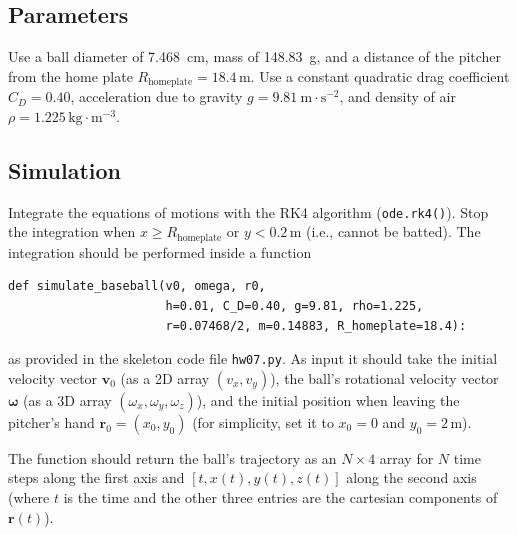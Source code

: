 \documentclass[letterpaper]{scrartcl}
\renewcommand{\vec}[1]{\ensuremath{\mathbf{#1}}}
\begin{document}
\subsection{Parameters}
\label{sec:parameters}

Use a ball diameter of 7.468~cm, mass of 148.83~g, and a distance of
the pitcher from the home plate $R_\text{homeplate} =
18.4\,\text{m}$.
Use a constant quadratic drag coefficient $C_{D} = 0.40$,
acceleration due to gravity $g = 9.81~\text{m}\cdot\text{s}^{-2}$, and
density of air $\rho = 1.225\,\text{kg}\cdot\text{m}^{-3}$.


\subsection{Simulation}
\label{sec:sim}

Integrate the equations of motions with the RK4 algorithm
(\texttt{ode.rk4()}). Stop the integration when
$x \ge R_\text{homeplate}$ or $y < 0.2\,\text{m}$
(i.e., cannot be batted). The integration should be performed inside a
function
\begin{verbatim}
def simulate_baseball(v0, omega, r0,
                      h=0.01, C_D=0.40, g=9.81, rho=1.225,
                      r=0.07468/2, m=0.14883, R_homeplate=18.4):  
\end{verbatim}
as provided in the skeleton code file \texttt{hw07.py}. As input it
should take the initial velocity vector $\vec{v}_{0}$ (as a 2D array
$(v_{x}, v_{y})$), the ball's rotational velocity vector
$\boldsymbol{\omega}$ (as a 3D array
$(\omega_{x}, \omega_{y}, \omega_{z})$), and the initial position when
leaving the pitcher's hand $\vec{r}_{0} = (x_{0}, y_{0})$ (for
simplicity, set it to $x_{0}=0$ and $y_{0}=2\,\text{m}$).

The function should return the ball's trajectory as an $N \times 4$
array for $N$ time steps along the first axis and
$[t, x(t), y(t), z(t)]$ along the second axis (where $t$ is the time
and the other three entries are the cartesian components of
$\vec{r}(t)$).
\end{document}
